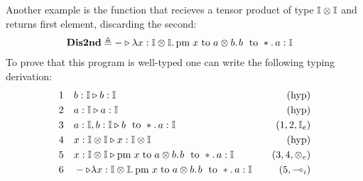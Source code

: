 \begin{example} \label{example:prog_Dis2nd}
Another example is the function that recieves a tensor product of type $\mathbb{I} \otimes \mathbb{I}$ and returns first element, discarding the second:
\begin{equation*}
\begin{split}
& \textbf{Dis2nd} \triangleq - \triangleright \lambda x: \mathbb{I \otimes I}. \, \text{pm} \hspace{3 pt} x \hspace{3 pt} \text{to} \hspace{3 pt} a \otimes b. \hspace{1 pt} b \hspace{3 pt} \text{ to } *. \,a:\mathbb{I}
\end{split}
\end{equation*}
To prove that this program is well-typed one can write the following typing derivation:
\begin{equation*}
\begin{split}
1  \hspace{10 pt} & b : \mathbb{I} \triangleright b : \mathbb{I}  \hspace{10 pt} & {(\text{hyp})} \\
2 \hspace{10 pt} & a : \mathbb{I} \triangleright a : \mathbb{I}  \hspace{10 pt} & {(\text{hyp})} \\
3 \hspace{10 pt} &  a : \mathbb{I}, b : \mathbb{I}  \triangleright b \hspace{3 pt} \text{ to } *.\,a: \mathbb{I}  & {(1,2,\mathbb{I}_{e})} \\
4 \hspace{10 pt} & x : \mathbb{I \otimes I} \triangleright x : \mathbb{I \otimes I}  \hspace{10 pt} & {(\text{hyp})} \\
5 \hspace{10 pt} & x : \mathbb{I \otimes I} \triangleright \text{pm} \hspace{3 pt} x \hspace{3 pt} \text{to} \hspace{3 pt} a \otimes b. \hspace{1 pt} b \hspace{3 pt} \text{ to } *.\,a : \mathbb{I} \hspace{10pt} & \text{($3,4,\otimes_{e}$)} \\
6 \hspace{10 pt} & - \triangleright \lambda x: \mathbb{I \otimes I}. \, \text{pm} \hspace{3 pt} x \hspace{3 pt} \text{to} \hspace{3 pt} a \otimes b. \hspace{1 pt} b \hspace{3 pt} \text{ to } *.\,a: \mathbb{I} \hspace{10pt} & \text{($5,\multimap_i$)}
\end{split}
\end{equation*}
\end{example}


